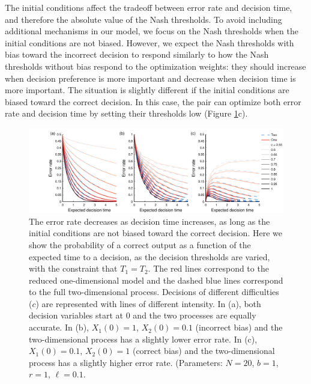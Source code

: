 \documentclass{article}
\begin{document}
The initial conditions affect the tradeoff between error rate and decision time, and therefore the absolute value of the Nash thresholds. To avoid including additional mechanisms in our model, we focus on the Nash thresholds when the initial conditions are not biased. However, we expect the Nash thresholds with bias toward the incorrect decision to respond similarly to how the Nash thresholds without bias respond to the optimization weights: they should increase when decision preference is more important and decrease when decision time is more important. The situation is slightly different if the initial conditions are biased toward the correct decision.  In this case, the pair can optimize both error rate and decision time by setting their thresholds low (Figure \ref{dimensionality}c).

\begin{figure}[tp]
\hspace{-1.75cm}
\includegraphics[width=6.9in]{dimensionality_comparison.pdf}
\caption{\label{dimensionality} The error rate decreases as decision time increases, as long as the initial conditions are not biased toward the correct decision. Here we show the probability of a correct output as a function of the expected time to a decision, as the decision thresholds are varied, with the constraint that $T_1=T_2$. The red lines correspond to the reduced one-dimensional model and the dashed blue lines correspond to the full two-dimensional process. Decisions of different difficulties ($c$) are represented with lines of different intensity. In (a), both decision variables start at $0$ and the two processes are equally accurate. In (b), $X_1(0)=1$, $X_2(0)=0.1$ (incorrect bias) and the two-dimensional process has a slightly lower error rate. In (c), $X_1(0)=0.1$, $X_2(0)=1$ (correct bias) and the two-dimensional process has a slightly higher error rate.  (Parameters: $N=20$, $b=1$, $r=1$, $\ell=0.1$.}
\end{figure}

\end{document}

